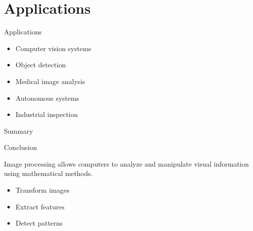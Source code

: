 \documentclass{beamer}
\begin{document}


\section{Applications}



\begin{frame}{Applications}


    \begin{itemize}

        \item Computer vision systems

        \item Object detection

        \item Medical image analysis

        \item Autonomous systems

        \item Industrial inspection


    \end{itemize}


\end{frame}





\begin{frame}{Summary}


    \begin{block}{Conclusion}

        Image processing allows computers to analyze and manipulate
        visual information using mathematical methods.

    \end{block}


    \begin{itemize}

        \item Transform images

        \item Extract features

        \item Detect patterns


    \end{itemize}


\end{frame}



\end{document}
